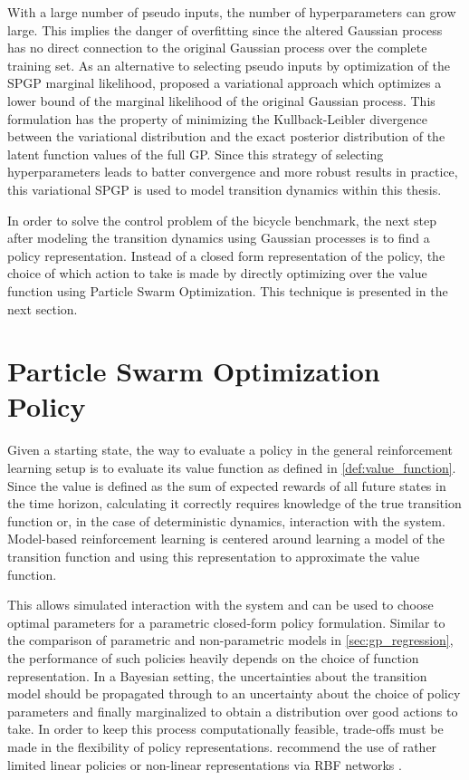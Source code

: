 With a large number of pseudo inputs, the number of hyperparameters can grow large.
This implies the danger of overfitting since the altered Gaussian process has no direct connection to the original Gaussian process over the complete training set.
As an alternative to selecting pseudo inputs by optimization of the SPGP marginal likelihood, \citeauthor{titsias_variational_2009} proposed a variational approach \cite{titsias_variational_2009} which optimizes a lower bound of the marginal likelihood of the original Gaussian process.
This formulation has the property of minimizing the Kullback-Leibler divergence between the variational distribution and the exact posterior distribution of the latent function values of the full GP.
Since this strategy of selecting hyperparameters leads to batter convergence and more robust results in practice, this variational SPGP is used to model transition dynamics within this thesis.

In order to solve the control problem of the bicycle benchmark, the next step after modeling the transition dynamics using Gaussian processes is to find a policy representation.
Instead of a closed form representation of the policy, the choice of which action to take is made by directly optimizing over the value function using Particle Swarm Optimization.
This technique is presented in the next section.

\section{Particle Swarm Optimization Policy}
Given a starting state, the way to evaluate a policy in the general reinforcement learning setup is to evaluate its value function as defined in \cref{def:value_function}.
Since the value is defined as the sum of expected rewards of all future states in the time horizon, calculating it correctly requires knowledge of the true transition function or, in the case of deterministic dynamics, interaction with the system.
Model-based reinforcement learning is centered around learning a model of the transition function and using this representation to approximate the value function.

This allows simulated interaction with the system and can be used to choose optimal parameters for a parametric closed-form policy formulation.
Similar to the comparison of parametric and non-parametric models in \cref{sec:gp_regression}, the performance of such policies heavily depends on the choice of function representation.
In a Bayesian setting, the uncertainties about the transition model should be propagated through to an uncertainty about the choice of policy parameters and finally marginalized to obtain a distribution over good actions to take.
In order to keep this process computationally feasible, trade-offs must be made in the flexibility of policy representations.
\citeauthor{deisenroth_pilco:_2011} recommend the use of rather limited linear policies or non-linear representations via RBF networks \cite{deisenroth_pilco:_2011}.

